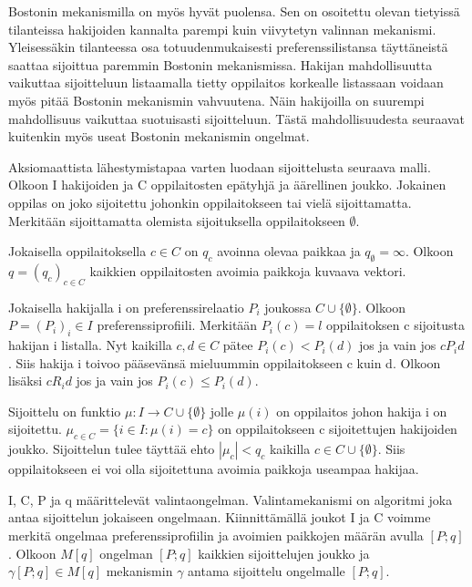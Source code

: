 \documentclass{tktltiki}
\begin{document}
Bostonin mekanismilla on myös hyvät puolensa. Sen on osoitettu olevan
tietyissä tilanteissa hakijoiden kannalta parempi kuin viivytetyn
valinnan mekanismi. Yleisessäkin tilanteessa osa totuudenmukaisesti
preferenssilistansa täyttäneistä saattaa sijoittua paremmin Bostonin
mekanismissa. Hakijan mahdollisuutta vaikuttaa sijoitteluun
listaamalla tietty oppilaitos korkealle listassaan voidaan myös pitää
Bostonin mekanismin vahvuutena. Näin hakijoilla on suurempi
mahdollisuus vaikuttaa suotuisasti sijoitteluun. Tästä
mahdollisuudesta seuraavat kuitenkin myös useat Bostonin mekanismin
ongelmat.

Aksiomaattista lähestymistapaa varten luodaan sijoittelusta seuraava
malli. Olkoon I hakijoiden ja C oppilaitosten epätyhjä ja äärellinen
joukko. Jokainen oppilas on joko sijoitettu johonkin oppilaitokseen
tai vielä sijoittamatta. Merkitään sijoittamatta olemista
sijoituksella oppilaitokseen \(\emptyset\).

Jokaisella oppilaitoksella \(c \in C\) on \(q_c\) avoinna olevaa
paikkaa ja \(q_{\emptyset} = \infty\). Olkoon \(q = (q_c)_{c \in C}\)
kaikkien oppilaitosten avoimia paikkoja kuvaava vektori.

Jokaisella hakijalla i on preferenssirelaatio \(P_i\) joukossa \(C
\cup \{\emptyset\}\). Olkoon \(P = (P_i)_i \in I\)
preferenssiprofiili. Merkitään \(P_i(c) = l\) oppilaitoksen c
sijoitusta hakijan i listalla. Nyt kaikilla \(c, d \in C\) pätee
\(P_i(c) < P_i(d)\) jos ja vain jos \(cP_id\). Siis hakija i toivoo
pääsevänsä mieluummin oppilaitokseen c kuin d. Olkoon lisäksi
\(cR_id\) jos ja vain jos \(P_i(c) \leq P_i(d)\).

Sijoittelu on funktio \(\mu : I \rightarrow C \cup \{\emptyset\}\)
jolle \(\mu(i)\) on oppilaitos johon hakija i on sijoitettu. \(\mu_{c
  \in C} = \{i \in I : \mu(i) = c\}\) on oppilaitokseen c
sijoitettujen hakijoiden joukko. Sijoittelun tulee täyttää ehto
\(|\mu_c| < q_c\) kaikilla \(c \in C \cup \{\emptyset\}\). Siis
oppilaitokseen ei voi olla sijoitettuna avoimia paikkoja useampaa
hakijaa.

I, C, P ja q määrittelevät valintaongelman. Valintamekanismi on
algoritmi joka antaa sijoittelun jokaiseen ongelmaan. Kiinnittämällä
joukot I ja C voimme merkitä ongelmaa preferenssiprofiilin ja avoimien
paikkojen määrän avulla \([P;q]\). Olkoon \(M[q]\) ongelman
\([P;q]\) kaikkien sijoittelujen joukko ja \(\gamma [P;q] \in M[q]\)
mekanismin \(\gamma\) antama sijoittelu ongelmalle \([P;q]\).
\end{document}
